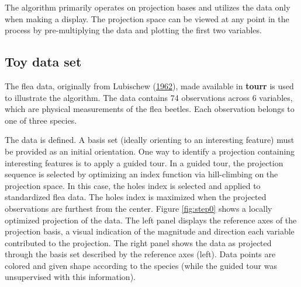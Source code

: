 The algorithm primarily operates on projection bases and utilizes the
data only when making a display. The projection space can be viewed at
any point in the process by pre-multiplying the data and plotting the
first two variables.

\hypertarget{toy-data-set}{%
\subsection{Toy data set}\label{toy-data-set}}

The flea data, originally from Lubischew
(\protect\hyperlink{ref-lubischew_use_1962}{1962}), made available in
\textbf{tourr} is used to illustrate the algorithm. The data contains 74
observations across 6 variables, which are physical measurements of the
flea beetles. Each observation belongs to one of three species.

The data is defined. A basis set (ideally orienting to an interesting
feature) must be provided as an initial orientation. One way to identify
a projection containing interesting features is to apply a guided tour.
In a guided tour, the projection sequence is selected by optimizing an
index function via hill-climbing on the projection space. In this case,
the holes index is selected and applied to standardized flea data. The
holes index is maximized when the projected observations are furthest
from the center. Figure \ref{fig:step0} shows a locally optimized
projection of the data. The left panel displays the reference axes of
the projection basis, a visual indication of the magnitude and direction
each variable contributed to the projection. The right panel shows the
data as projected through the basis set described by the reference axes
(left). Data points are colored and given shape according to the species
(while the guided tour was unsupervised with this information).

